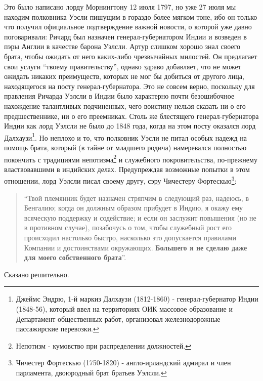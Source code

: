 \documentclass[
  oneside,
  12pt,
  titlepage]{book}
\begin{document}
Это было написано лорду Морнингтону 12 июля 1797, но уже 27 июля мы находим полковника Уэсли пишущим в гораздо более мягком тоне, ибо он только что получил официальное подтверждение важной новости, о которой уже давно поговаривали: Ричард был назначен генерал-губернатором Индии и возведен в пэры Англии в качестве барона Уэлсли. Артур слишком хорошо знал своего брата, чтобы ожидать от него каких-либо чрезвычайных милостей. Он предлагает свои услуги ``твоему правительству'', однако здраво добавляет, что не может ожидать никаких преимуществ, которых не мог бы добиться от другого лица, находящегося на посту генерал-губернатора. Это не совсем верно, поскольку для правления Ричарда Уэлсли в Индии было характерно почти безошибочное нахождение талантливых подчиненных, чего воистину нельзя сказать ни о его предшественнике, ни о его преемниках. Столь же блестящего генерал-губернатора Индии как лорд Уэлсли не было до 1848 года, когда на этом посту оказался лорд Далхаузи\footnote{Джеймс Эндрю, 1-й маркиз Далхаузи (1812-1860) - генерал-губернатор Индии (1848-56), который ввел на территориях ОИК массовое образование и Департамент общественных работ, организовал железнодорожные пассажирские перевозки.}. Но неплохо и то, что полковник Уэсли не питал особых надежд на помощь брата, который (в тайне от младшего родича) намеревался полностью покончить с традициями непотизма\footnote{Непотизм - кумовство при распределении должностей.} и служебного покровительства, по-прежнему властвовавшими в индийских делах. Предупреждая возможные попытки в этом отношении, лорд Уэлсли писал своему другу, сэру Чичестеру Фортескью\footnote{Чичестер Фортескью (1750-1820) - англо-ирландский адмирал и член парламента, двоюродный брат братьев Уэлсли.}:

\begin{quote}
``Твой племянник будет назначен стряпчим в следующий раз, надеюсь, в Бенгалию; когда он должным образом прибудет в Индию, я окажу ему всяческую поддержку и содействие; и если он заслужит повышения (но не в противном случае), позабочусь о том, чтобы служебный рост его происходил настолько быстро, насколько это допускается правилами Компании и достоинствами окружающих. \textbf{Большего я не сделаю даже для моего собственного брата}''.
\end{quote}

Сказано решительно.
\end{document}
